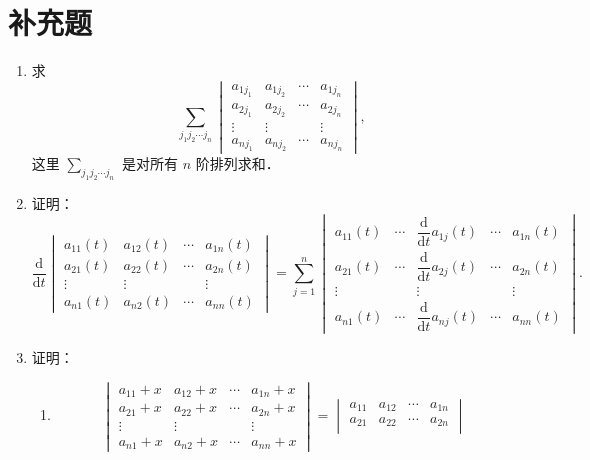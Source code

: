 \section{补充题}
\begin{enumerate}
  \item 求
  \[
    \sum_{j_1j_2\cdots j_n}
    \begin{vmatrix}
      a_{1j_1}&a_{1j_2}&\cdots&a_{1j_n}\\
      a_{2j_1}&a_{2j_2}&\cdots&a_{2j_n}\\
      \vdots&\vdots&&\vdots\\
      a_{nj_1}&a_{nj_2}&\cdots&a_{nj_n}
    \end{vmatrix},
  \]
  这里 $\displaystyle\sum_{j_1j_2\cdots j_n}$ 是对所有 $n$ 阶排列求和．
  \anscompute
  \item 证明：
  \[
    \frac{\mathrm{d}}{\mathrm{d}t}
    \begin{vmatrix}
      a_{11}(t)&a_{12}(t)&\cdots&a_{1n}(t)\\
      a_{21}(t)&a_{22}(t)&\cdots&a_{2n}(t)\\
      \vdots&\vdots&&\vdots\\
      a_{n1}(t)&a_{n2}(t)&\cdots&a_{nn}(t)
    \end{vmatrix}
    =
    \sum_{j=1}^n
    \begin{vmatrix}
      a_{11}(t)&\cdots&\dfrac{\mathrm{d}}{\mathrm{d}t}a_{1j}(t)&\cdots&a_{1n}(t)\\
      a_{21}(t)&\cdots&\dfrac{\mathrm{d}}{\mathrm{d}t}a_{2j}(t)&\cdots&a_{2n}(t)\\
      \vdots&&\vdots&&\vdots\\
      a_{n1}(t)&\cdots&\dfrac{\mathrm{d}}{\mathrm{d}t}a_{nj}(t)&\cdots&a_{nn}(t)
    \end{vmatrix}.
  \]
  \ansproof
  \item 证明：
  \begin{enumerate}
    \item \[
    \begin{vmatrix}
      a_{11}+x&a_{12}+x&\cdots&a_{1n}+x\\
      a_{21}+x&a_{22}+x&\cdots&a_{2n}+x\\
      \vdots&\vdots&&\vdots\\
      a_{n1}+x&a_{n2}+x&\cdots&a_{nn}+x
    \end{vmatrix}
    =
    \begin{vmatrix}
      a_{11}&a_{12}&\cdots&a_{1n}\\
      a_{21}&a_{22}&\cdots&a_{2n}\\

\end{vmatrix}\]
\end{enumerate}
\end{enumerate}
